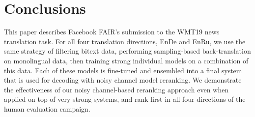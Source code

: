\documentclass[11pt,a4paper]{article}
\newcommand{\enbide}{EnDe}
\newcommand{\enbiru}{EnRu}
\begin{document}
\section{Conclusions}
This paper describes Facebook FAIR's submission to the WMT19 news translation task.
For all four translation directions, \enbide{} and \enbiru{}, we use the same strategy of filtering bitext data, performing sampling-based back-translation on monolingual data, then training strong individual models on a combination of this data.
Each of these models is fine-tuned and ensembled into a final system that is used for decoding with noisy channel model reranking.
We demonstrate the effectiveness of our noisy channel-based reranking approach even when applied on top of very strong systems, and rank first in all four directions of the human evaluation campaign.

 


\end{document}
